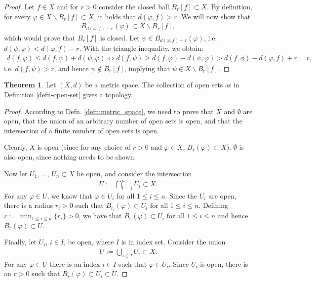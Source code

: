\documentclass[12pt, a4paper]{article}
\numberwithin{equation}{section}
\theoremstyle{definition}
\theoremstyle{definition}
\newtheorem{theorem}[thm]{Theorem}
\begin{document}
	\begin{proof}
		Let $f\in X$ and for $r > 0$ consider the closed ball $B_{r}[f]\subset X$. By definition, for every $\varphi \in X\backslash B_{r}[f]\subset X$, it holds that $d(\varphi, f) > r$. We will now show that 
		\begin{align}
			B_{d(\varphi, f) - r}(\varphi) \subset X \backslash B_{r}[f],
		\end{align}
		which would prove that $B_{r}[f]$ is closed. Let $\psi\in B_{d(\varphi, f) - r}(\varphi)$, i.e. $d(\psi, \varphi) < d(\varphi, f) -r$. With the triangle inequality, we obtain:
		\begin{align}
			d(f, \varphi) \leq d(f, \psi) + d(\psi, \varphi) \Leftrightarrow d(f, \psi) \geq d(f, \varphi) - d(\psi, \varphi) > d(f, \phi) - d(\varphi, f) + r = r, 
		\end{align}
		i.e. $d(f, \psi) > r$, and hence $\psi\notin B_r[f]$, implying that $\psi\in X\backslash B_{r}[f]$. 
	\end{proof}
	
	\begin{theorem}
		Let $(X, d)$ be a metric space. The collection of open sets as in Definition \ref{defn-open-set} gives a topology.
	\end{theorem}
	\begin{proof}		
		According to Defn. \ref{defn:metric_space}, we need to prove that $X$ and $\emptyset$ are open, that the union of an arbitrary number of open sets is open, and that the intersection of a finite number of open sets is open. 
		
		Clearly, $X$ is open (since for any choice of $r > 0$ and $\varphi\in X$, $B_{r}(\varphi)\subset X$). $\emptyset$ is also open, since nothing needs to be shown.
		
		Now let $U_{1}$, $\dots$, $U_{n}\subset X$ be open, and consider the intersection
		\begin{align}
			U := \bigcap_{i=1}^{n}U_{i} \subset X.
		\end{align} 
		For any $\varphi\in U$, we know that $\varphi\in U_i$ for all $1\leq i \leq n$. Since the $U_{i}$ are open, there is a radius $r_{i} > 0$ such that $B_{r_i}(\varphi) \subset U_i$ for all $1\leq i \leq n$. Defining $r := \min_{1 \leq i \leq n}\{r_{i}\} > 0$, we have that $B_{r}(\varphi) \subset U_i$ for all $1\leq i\leq n$ and hence $B_{r}(\varphi)\subset U$.
		
		Finally, let $U_{i}$, $i\in I$, be open, where $I$ is in index set. Consider the union
		\begin{align}
			U := \bigcup_{i\in I}U_{i} \subset X.
		\end{align}
		For any $\varphi\in U$ there is an index $i\in I$ such that $\varphi\in U_i$. Since $U_i$ is open, there is an $r > 0$ such that $B_{r}(\varphi) \subset U_i \subset U$.
	\end{proof}
\end{document}

